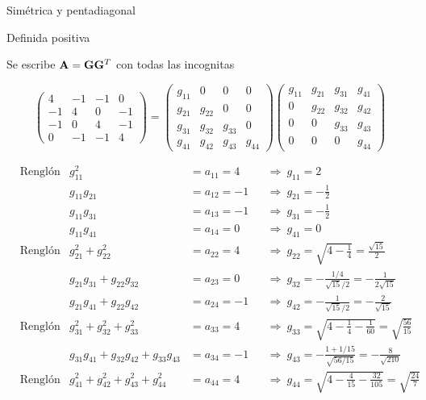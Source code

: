 Simétrica y pentadiagonal 

Definida positiva 




Se escribe $\mathbf{A} = \mathbf{G}\mathbf{G}^T$ con todas las incognitas

\[
\begin{pmatrix}
	4 & -1 & -1 &  0\\
	-1 &  4 &  0 & -1\\
	-1 &  0 &  4 & -1\\
	0 & -1 & -1 &  4
\end{pmatrix}
=
\begin{pmatrix}
	g_{11} & 0 & 0 & 0\\
	g_{21} & g_{22} & 0 & 0\\
	g_{31} & g_{32} & g_{33} & 0\\
	g_{41} & g_{42} & g_{43} & g_{44}
\end{pmatrix}
\begin{pmatrix}
	g_{11} & g_{21} & g_{31} & g_{41}\\
	0 & g_{22} & g_{32} & g_{42}\\
	0 & 0 & g_{33} & g_{43}\\
	0 & 0 & 0 & g_{44}
\end{pmatrix}
\]

\begin{align*}
	&\text{Renglón 1:} &
	g_{11}^2 &= a_{11} = 4 & &\Rightarrow\ g_{11} = 2\\
	& & g_{11}g_{21} &= a_{12} = -1 & &\Rightarrow\ g_{21} = -\tfrac12\\
	& & g_{11}g_{31} &= a_{13} = -1 & &\Rightarrow\ g_{31} = -\tfrac12\\
	& & g_{11}g_{41} &= a_{14} = 0 & &\Rightarrow\ g_{41} = 0\\[4pt]
	&\text{Renglón 2:} &
	g_{21}^2 + g_{22}^2 &= a_{22} = 4 & &\Rightarrow\ g_{22} = \sqrt{4 - \tfrac14} = \tfrac{\sqrt{15}}{2}\\
	& & g_{21}g_{31} + g_{22}g_{32} &= a_{23} = 0 & &\Rightarrow\ g_{32} = -\frac{1/4}{\sqrt{15}/2} = -\frac{1}{2\sqrt{15}}\\
	& & g_{21}g_{41} + g_{22}g_{42} &= a_{24} = -1 & &\Rightarrow\ g_{42} = -\frac{1}{\sqrt{15}/2} = -\frac{2}{\sqrt{15}}\\[4pt]
	&\text{Renglón 3:} &
	g_{31}^2 + g_{32}^2 + g_{33}^2 &= a_{33} = 4 & &\Rightarrow\ g_{33} = \sqrt{4 - \tfrac14 - \tfrac{1}{60}} = \sqrt{\tfrac{56}{15}}\\
	& & g_{31}g_{41} + g_{32}g_{42} + g_{33}g_{43} &= a_{34} = -1 & &\Rightarrow\ g_{43} = -\frac{1 + 1/15}{\sqrt{56/15}} = -\frac{8}{\sqrt{210}}\\[4pt]
	&\text{Renglón 4:} &
	g_{41}^2 + g_{42}^2 + g_{43}^2 + g_{44}^2 &= a_{44} = 4 & &\Rightarrow\ g_{44} = \sqrt{4 - \tfrac{4}{15} - \tfrac{32}{105}} = \sqrt{\tfrac{24}{7}}
\end{align*}

